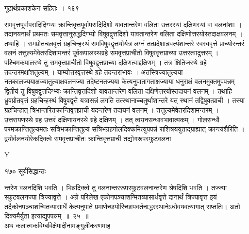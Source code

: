 \documentclass[11pt, openany]{book}
\begin{document}
\newpage




 \hspace{3cm} गूढार्थप्रकाशकेन सहितः~। \hfill १६९
\vspace{1cm}

\begin{sloppypar}
\noindent समवृत्तपूर्वापरादिदिग्भ्यः क्रान्तिवृत्तपूर्वापरादिदिशो यावतान्तरेण वलिता उत्तरस्यां दक्षिणस्यां वा वलनांशाः । तदानयनार्थं प्रथमतः समवृत्तानुरुद्धदिग्भ्यो विषुवद्वृत्तदिशो यावतान्तरेण वलिता दक्षिणोत्तरयोस्तदाक्षवलनम् । तथाहि । समप्रोतचलवृत्तं ग्रहचिन्हस्थं समविषुवद्वृत्तयोर्यत्र लग्नं तत्प्रदेशान्नवत्यंशान्तरे स्वस्ववृत्ते प्राच्योरन्तरं वलनं तत्तुल्यमेवेतरदिशामन्तरं पूर्वकपालस्थग्रहे समवृत्तप्राचीतो विषुववृत्तप्राच्या उत्तरत्वादुत्तरम् । पश्चिमकपालस्थे तु समवृत्तप्राचीतो विषुवद्वृत्तप्राच्या दक्षिणत्वाद्दक्षिणम् । तत्र क्षितिजस्थे ग्रहे तदन्तरमक्षांशतुल्यम् । याम्योत्तरवृत्तस्थे ग्रहे तदन्तराभावः । अतस्त्रिज्यातुल्यया नतकालज्ययाक्षज्यातुल्याक्षवलनज्या तदेष्टनतज्यया केत्यनुपातागताक्षज्याया धनुराक्षं वलनमुक्तमुपपन्नम् । द्वितीयं तु विषुवद्वृत्तदिग्भ्यः क्रान्तिवृत्तदिशो यावतान्तरेण वलिता दक्षिणेत्तरयोस्तदायनं वलनम् । तथाहि ध्रुवप्रोतवृत्तं ग्रहचिन्हस्थं विषुवद्वृत्ते यत्रासन्नं लगति तत्स्थानाच्चतुर्थाशान्तरे यत् स्थानं तद्विषुवत्प्राची । तस्या ग्रहचिन्हात् त्रिभान्तरितक्रान्तिवृत्तप्राची यदन्तरेण तदायनं वलनम् । तत्तुल्यमेवेतरदिशामन्तरम् । उत्तरायणस्थे ग्रह उत्तरं दक्षिणायनस्थे ग्रहे दक्षिणम् । तत् त्वयनसन्धावभावात्मकम् । गोलसन्धौ परमक्रान्तितुल्यमतः सत्रिभक्रान्तितुल्यं सत्रिभग्रहगोलदिक्कमित्युपपन्नं राशित्रययुताद्ग्राह्यात् क्रान्त्यंशैरिति । द्वयोर्वलनयोरेकदिक्त्वे समवृत्तप्राचीतः क्रान्तिवृत्तप्राची तद्योगरूपस्फुटवलना\textendash
\end{sloppypar}

{\tiny{Y}}

\newpage





 \noindent १७० \hspace{4cm} सूर्यसिद्धान्तः 
\vspace{1cm}

\begin{sloppypar}
\noindent न्तरेण वलनदिशि भवति । भिन्नदिक्त्वे तु वलनान्तररूपस्फुटवलनान्तरेण श्रेषदिशि भवति । तज्ज्या स्फुटवलनज्या त्रिज्यावृत्ते । अग्रे परिलेख एकोनपञ्चाशन्मितव्यासार्धवृत्ते दानार्थं त्रिज्यावृत्त इयं तदैकोनपञ्चाशन्मितव्यासार्धे केत्यनुपाते प्रमाणेच्छयोरिच्छापवर्तनाद्धरस्थानेऽधोवयवत्यागात् सप्ततिः। अतो दिक्यमैर्युता इत्याद्युपपन्नम्~॥~२५~॥\\
\noindent अथ कलात्मकबिम्बविक्षेपादीनामङ्गुलीकरणमाह\textendash
\end{sloppypar}
\end{document}
